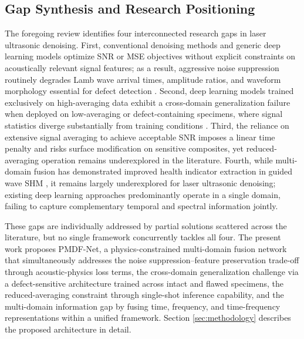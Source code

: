 \subsection{Gap Synthesis and Research Positioning}
\label{sec:gap-synthesis}

The foregoing review identifies four interconnected research gaps in laser ultrasonic denoising. First, conventional denoising methods and generic deep learning models optimize SNR or MSE objectives without explicit constraints on acoustically relevant signal features; as a result, aggressive noise suppression routinely degrades Lamb wave arrival times, amplitude ratios, and waveform morphology essential for defect detection \cite{chen2019wavelet}. Second, deep learning models trained exclusively on high-averaging data exhibit a cross-domain generalization failure when deployed on low-averaging or defect-containing specimens, where signal statistics diverge substantially from training conditions \cite{liu2022deep, zhang2020deep}. Third, the reliance on extensive signal averaging to achieve acceptable SNR imposes a linear time penalty and risks surface modification on sensitive composites, yet reduced-averaging operation remains underexplored in the literature. Fourth, while multi-domain fusion has demonstrated improved health indicator extraction in guided wave SHM \cite{perry2026health}, it remains largely underexplored for laser ultrasonic denoising; existing deep learning approaches predominantly operate in a single domain, failing to capture complementary temporal and spectral information jointly.

These gaps are individually addressed by partial solutions scattered across the literature, but no single framework concurrently tackles all four. The present work proposes PMDF-Net, a physics-constrained multi-domain fusion network that simultaneously addresses the noise suppression--feature preservation trade-off through acoustic-physics loss terms, the cross-domain generalization challenge via a defect-sensitive architecture trained across intact and flawed specimens, the reduced-averaging constraint through single-shot inference capability, and the multi-domain information gap by fusing time, frequency, and time-frequency representations within a unified framework. Section \ref{sec:methodology} describes the proposed architecture in detail.

